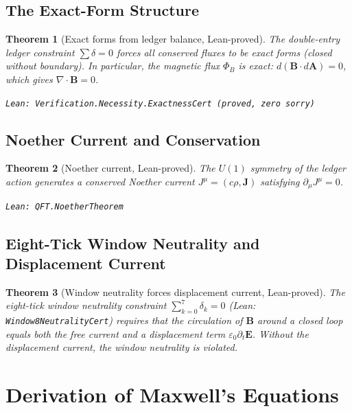 \documentclass[12pt,a4paper]{article}
\newtheorem{theorem}{Theorem}[section]
\theoremstyle{definition}
\theoremstyle{remark}
\begin{document}
\subsection{The Exact-Form Structure}

\begin{theorem}[Exact forms from ledger balance, Lean-proved]
\label{thm:exact}
The double-entry ledger constraint $\sum \delta = 0$ forces all
conserved fluxes to be exact forms (closed without boundary).
In particular, the magnetic flux $\Phi_B$ is exact:
$d(\mathbf{B}\cdot d\mathbf{A}) = 0$, which gives $\nabla \cdot \mathbf{B} = 0$.

\texttt{Lean: Verification.Necessity.ExactnessCert (proved, zero sorry)}
\end{theorem}

\subsection{Noether Current and Conservation}

\begin{theorem}[Noether current, Lean-proved]\label{thm:noether}
The $U(1)$ symmetry of the ledger action generates a conserved Noether
current $J^\mu = (c\rho, \mathbf{J})$ satisfying $\partial_\mu J^\mu = 0$.

\texttt{Lean: QFT.NoetherTheorem}
\end{theorem}

\subsection{Eight-Tick Window Neutrality and Displacement Current}

\begin{theorem}[Window neutrality forces displacement current, Lean-proved]
\label{thm:disp}
The eight-tick window neutrality constraint $\sum_{k=0}^{7} \delta_k = 0$
(Lean: \texttt{Window8NeutralityCert}) requires that the circulation of
$\mathbf{B}$ around a closed loop equals both the free current and a
displacement term $\varepsilon_0 \partial_t \mathbf{E}$.  Without the
displacement current, the window neutrality is violated.
\end{theorem}

\section{Derivation of Maxwell's Equations}
\end{document}
